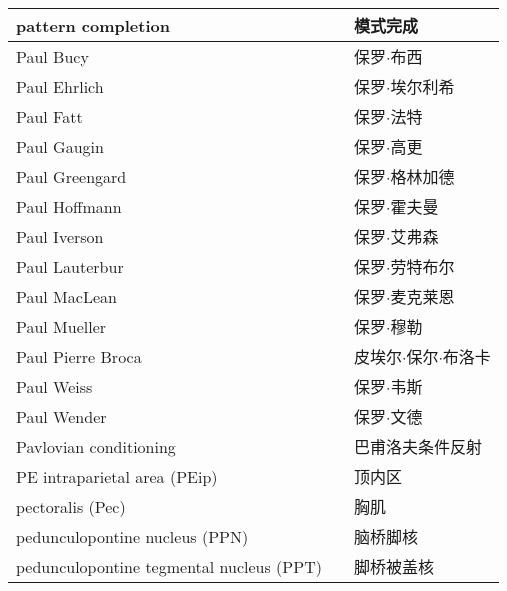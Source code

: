 \begin{longtable}{lll}
	\midrule
	pattern completion     && 模式完成   \\
	
	\midrule
	Paul Bucy     && 保罗$\cdot$布西  \\
	
	\midrule
	Paul Ehrlich     && 保罗$\cdot$埃尔利希  \\
	
	\midrule
	Paul Fatt     && 保罗$\cdot$法特  \\
	
	\midrule
	Paul Gaugin     && 保罗$\cdot$高更  \\
	
	\midrule
	Paul Greengard     && 保罗$\cdot$格林加德  \\
	
	\midrule
	Paul Hoffmann     && 保罗$\cdot$霍夫曼  \\
	
	\midrule
	Paul Iverson     && 保罗$\cdot$艾弗森  \\
	
	\midrule
	Paul Lauterbur     && 保罗$\cdot$劳特布尔  \\
	
	\midrule
	Paul MacLean     && 保罗$\cdot$麦克莱恩  \\
	
	\midrule
	Paul Mueller     && 保罗$\cdot$穆勒  \\
	
	\midrule
	Paul Pierre Broca     && 皮埃尔$\cdot$保尔$\cdot$布洛卡  \\
	
	\midrule
	Paul Weiss     && 保罗$\cdot$韦斯  \\
	
	\midrule
	Paul Wender     && 保罗$\cdot$文德  \\
	
	\midrule
	Pavlovian conditioning     && 巴甫洛夫条件反射  \\
	
	\midrule
	PE intraparietal area (PEip)   && 顶内区   \\
	
	\midrule
	pectoralis (Pec)    && 胸肌   \\
	
	\midrule
	pedunculopontine nucleus (PPN)     && 脑桥脚核   \\
	
	\midrule
	pedunculopontine tegmental nucleus (PPT)     && 脚桥被盖核   \\
	

\end{longtable}
